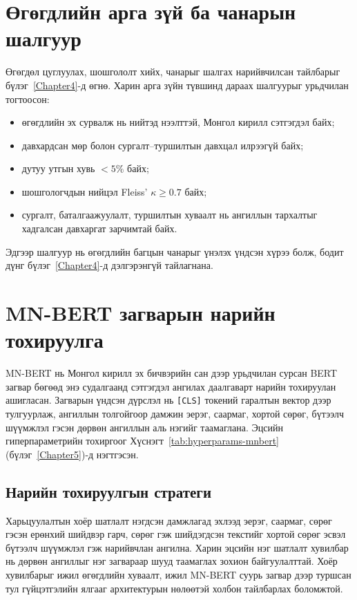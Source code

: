 \section{Өгөгдлийн арга зүй ба чанарын шалгуур}

Өгөгдөл цуглуулах, шошгололт хийх, чанарыг шалгах нарийвчилсан тайлбарыг
бүлэг~\ref{Chapter4}-д өгнө. Харин арга зүйн түвшинд дараах шалгуурыг урьдчилан
тогтоосон:

\begin{itemize}
  \item өгөгдлийн эх сурвалж нь нийтэд нээлттэй, Монгол кирилл сэтгэгдэл байх;
  \item давхардсан мөр болон сургалт--туршилтын давхцал илрээгүй байх;
  \item дутуу утгын хувь $<5\%$ байх;
  \item шошгологчдын нийцэл Fleiss' $\kappa \geq 0.7$ байх;
  \item сургалт, баталгаажуулалт, туршилтын хуваалт нь ангиллын тархалтыг
        хадгалсан давхаргат зарчимтай байх.
\end{itemize}

Эдгээр шалгуур нь өгөгдлийн багцын чанарыг үнэлэх үндсэн хүрээ болж, бодит
дүнг бүлэг~\ref{Chapter4}-д дэлгэрэнгүй тайлагнана.

\section{MN-BERT загварын нарийн тохируулга}

MN-BERT нь Монгол кирилл эх бичвэрийн сан дээр урьдчилан сурсан BERT загвар бөгөөд энэ
судалгаанд сэтгэгдэл ангилах даалгаварт нарийн тохируулан ашигласан. Загварын
үндсэн дүрслэл нь \texttt{[CLS]} токений гаралтын вектор дээр тулгуурлаж,
ангиллын толгойгоор дамжин эерэг, саармаг, хортой сөрөг, бүтээлч шүүмжлэл
гэсэн дөрвөн ангиллын аль нэгийг таамаглана. Эцсийн гиперпараметрийн
тохиргоог Хүснэгт~\ref{tab:hyperparams-mnbert} (бүлэг~\ref{Chapter5})-д
нэгтгэсэн.

\subsection{Нарийн тохируулгын стратеги}

Харьцуулалтын хоёр шатлалт нэгдсэн дамжлагад эхлээд эерэг, саармаг, сөрөг
гэсэн ерөнхий шийдвэр гарч, сөрөг гэж шийдэгдсэн текстийг хортой сөрөг эсвэл
бүтээлч шүүмжлэл гэж нарийвчлан ангилна. Харин
эцсийн нэг шатлалт хувилбар нь дөрвөн ангиллыг нэг загвараар шууд таамаглах
зохион байгуулалттай. Хоёр хувилбарыг ижил өгөгдлийн хуваалт, ижил MN-BERT
суурь загвар дээр туршсан тул гүйцэтгэлийн ялгааг архитектурын нөлөөтэй
холбон тайлбарлах боломжтой.

